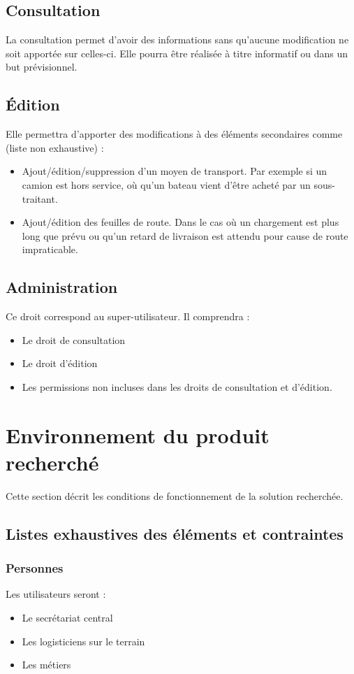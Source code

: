 \subsection{Consultation}
La consultation permet d'avoir des informations sans qu'aucune modification ne soit apportée sur celles-ci. Elle pourra être réalisée à titre informatif ou dans un but prévisionnel.

\subsection{Édition}
Elle permettra d'apporter des modifications à des éléments secondaires comme (liste non exhaustive) :
\begin{itemize}
\item Ajout/édition/suppression d'un moyen de transport. Par exemple si un camion est hors service, où qu'un bateau vient d'être acheté par un sous-traitant.
\item Ajout/édition des feuilles de route. Dans le cas où un chargement est plus long que prévu ou qu'un retard de livraison est attendu pour cause de route impraticable.
\end{itemize}

\subsection{Administration}
Ce droit correspond au super-utilisateur. Il comprendra :
\begin{itemize}
\item Le droit de consultation
\item Le droit d'édition
\item Les permissions non incluses dans les droits de consultation et d'édition.
\end{itemize}

\section{Environnement du produit recherché}
Cette section décrit les conditions de fonctionnement de la solution recherchée.

\subsection{Listes exhaustives des éléments et contraintes}

\subsubsection{Personnes}
Les utilisateurs seront :
\begin{itemize}
\item Le secrétariat central
\item Les logisticiens sur le terrain
\item Les métiers
\end{itemize}

